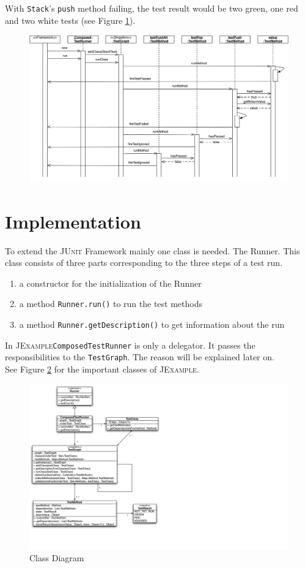 \documentclass[11pt]{article}
\newcommand{\JUnit}{\textsc{JUnit}\xspace}
\newcommand{\JExample}{\textsc{JExample}\xspace}
\newcommand{\ttt}[1]{\texttt{#1}}
\begin{document}
With \ttt{Stack}'s \ttt{push} method failing, the test result would be two green, one red and two white tests (see Figure \ref{fig:testPush}).

\begin{figure}[htbp]
 \includegraphics[width=15.0cm]{testPush.pdf}
 \caption{}
 \label{fig:testPush}
\end{figure}

\section{Implementation}

To extend the \JUnit Framework mainly one class is needed. The Runner. This class consists of three parts corresponding to the three steps of a test run.

\begin{enumerate}
 \item a constructor for the initialization of the Runner
 \item a method \verb|Runner.run()| to run the test methods
 \item a method \verb|Runner.getDescription()| to get information about the run
\end{enumerate}
In \JExample \verb|ComposedTestRunner| is only a delegator. It passes the responsibilities to the \verb|TestGraph|. The reason will be explained later on.\\
See Figure \ref{fig:classDiag} for the important classes of \JExample.

\begin{figure}[htbp]
 \includegraphics[width=24.0cm]{classdiagram.pdf}
 \caption{Class Diagram}
 \label{fig:classDiag}
\end{figure}
\end{document}
